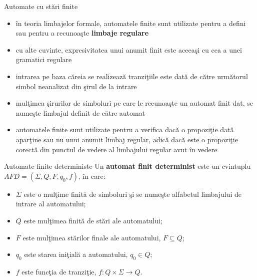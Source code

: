 \documentclass[pdf]{beamer}
\begin{document}
\begin{frame}{Automate cu stări finite}
\begin{itemize}
\item
în teoria limbajelor formale, automatele finite sunt utilizate pentru a defini sau pentru a recunoaşte \textbf{limbaje regulare}
\item
cu alte cuvinte, expresivitatea unui anumit finit este aceeaşi cu cea a unei gramatici regulare
\item
intrarea pe baza căreia se realizează tranziţiile este dată de către următorul simbol neanalizat din şirul de la intrare
\item
mulţimea şirurilor de simboluri pe care le recunoaşte un automat finit dat, se numeşte limbajul definit de către automat
\item
automatele finite sunt utilizate pentru a verifica dacă o propoziţie dată aparţine sau nu unui anumit limbaj regular, adică dacă este o propoziţie corectă din punctul de vedere al limbajului regular avut în vedere
\end{itemize}
\end{frame}



\begin{frame}{Automate finite deterministe}
Un \textbf{automat finit determinist} este un cvintuplu $AFD=(\Sigma, Q, F, q_{0}, f)$, în care:
\begin{itemize}
\item
$\Sigma$ este o mulţime finită de simboluri şi se numeşte alfabetul limbajului de intrare al automatului;
\item
$Q$ este mulţimea finită de stări ale automatului;
\item
$F$ este mulţimea stărilor finale ale automatului, $F \subseteq Q$;
\item
$q_{0}$ este starea iniţială a automatului, $q_{0} \in Q$;
\item
$f$ este funcţia de tranziţie, $f:Q \times \Sigma \rightarrow Q$.
\end{itemize}
\end{frame}
\end{document}
